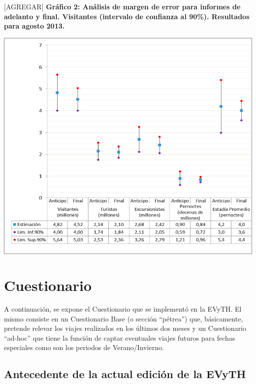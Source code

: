 \documentclass[
  openany]{book}
\begin{document}
{[}AGREGAR{]} \textbf{Gráfico 2: Análisis de margen de error para informes de adelanto y final. Visitantes (intervalo de confianza al 90\%). Resultados para agosto 2013.}

\includegraphics{cuadros_graficos/06_grafico_margen_de_error.png}

\hypertarget{cuestionario}{%
\chapter{Cuestionario}\label{cuestionario}}

A continuación, se expone el Cuestionario que se implementó en la EVyTH.
El mismo consiste en un Cuestionario Base (o sección ``pétrea'') que, básicamente, pretende relevar los viajes realizados en los últimos dos meses y un Cuestionario ``ad-hoc'' que tiene la función de captar eventuales viajes futuros para fechas especiales como son los periodos de Verano/Invierno.

\hypertarget{antecedente-de-la-actual-ediciuxf3n-de-la-evyth}{%
\section{Antecedente de la actual edición de la EVyTH}\label{antecedente-de-la-actual-ediciuxf3n-de-la-evyth}}
\end{document}
